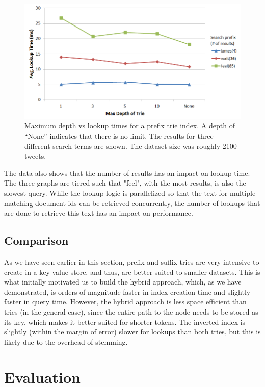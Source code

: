 \documentclass{vldb}
\begin{document}
\begin{figure}[h!]
   \includegraphics[scale=.38]{trie_maxdepth_graph}
  \caption{Maximum depth vs lookup times for a prefix trie index. A depth of ``None'' indicates that there is no limit. The results for three different search terms are shown. The dataset size was roughly 2100 tweets.}
\label{comptrie}
\end{figure}

The data also shows that the number of results has an  impact on lookup time. The three graphs are tiered such that "feel", with the most results, is also the slowest query. While the lookup logic is parallelized so that the text for multiple matching document ids can be retrieved concurrently, the number of lookups that are done to retrieve this text has an impact on performance.

\subsection{Comparison}

As we have seen earlier in this section, prefix and suffix tries are very intensive to create in a key-value store, and thus, are better suited to smaller datasets. This is what initially motivated us to build the hybrid approach, which, as we have demonstrated, is orders of magnitude faster in index creation time and slightly faster in query time. However, the hybrid approach is less space efficient than tries (in the general case), since the entire path to the node needs to be stored as its key, which makes it better suited for shorter tokens. The inverted index is slightly (within the margin of error) slower for lookups than both tries, but this is likely due to the overhead of stemming.

\section{Evaluation}
\end{document}
